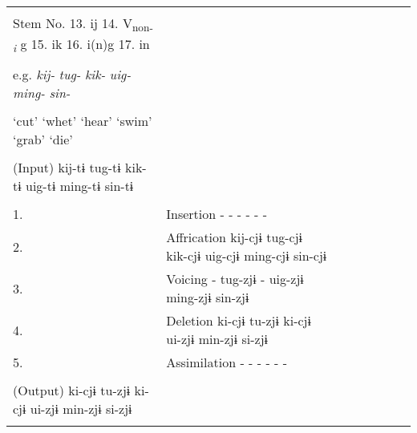 \begin{table}
\begin{tabularx}{\textwidth}{XX lll lll}
                                                                                                                               \\
\tablevspace                                                                                                                   \\
  Stem No.  13. ij  14. V\textsubscript{non-}\textit{\textsubscript{i}} g  15. ik  16. i(n)g    17. in                         \\
                                                                                                                               \\
  e.g.  \textit{kij-}  \textit{tug-}  \textit{kik-}  \textit{uig-}  \textit{ming-}  \textit{sin-}\\                            \\
 ‘cut’  ‘whet’  ‘hear’  ‘swim’  ‘grab’  ‘die’                                                                                  \\
                                                                                                                               \\
  (Input)  kij-tɨ  tug-tɨ  kik-tɨ  uig-tɨ  ming-tɨ  sin-tɨ                                                                     \\
\midrule                                                                                                                       \\
1. & Insertion  -  -  -  -  -  -                                                                                               \\
2. & Affrication  kij-cjɨ  tug-cjɨ  kik-cjɨ  uig-cjɨ  ming-cjɨ  sin-cjɨ                                                        \\
3. & Voicing  -  tug-zjɨ  -  uig-zjɨ  ming-zjɨ  sin-zjɨ                                                                        \\
4. & Deletion  ki-cjɨ  tu-zjɨ  ki-cjɨ  ui-zjɨ  min-zjɨ  si-zjɨ                                                                 \\
5. & Assimilation  -  -  -  -  -  -                                                                                            \\
\midrule                                                                                                                       \\
  (Output)  ki-cjɨ  tu-zjɨ  ki-cjɨ  ui-zjɨ  min-zjɨ  si-zjɨ                                                                    \\
  \lspbottomrule
\end{tabularx}

\end{table}

